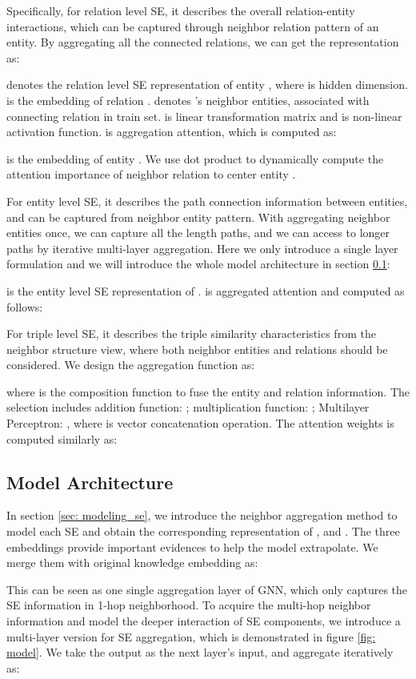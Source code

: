 \documentclass[letterpaper]{article} \usepackage{aaai22}  \usepackage{times}  \usepackage{helvet}  \usepackage{courier}  \usepackage[hyphens]{url}  \usepackage{graphicx} \urlstyle{rm} \def\UrlFont{\rm}  \usepackage{natbib}  \usepackage{caption} \DeclareCaptionStyle{ruled}{labelfont=normalfont,labelsep=colon,strut=off} \frenchspacing  \setlength{\pdfpagewidth}{8.5in}  \setlength{\pdfpageheight}{11in}  \usepackage{algorithm}
\begin{document}
Specifically, for relation level SE, it describes the overall relation-entity interactions, which can be captured through neighbor relation pattern of an entity. By aggregating all the connected relations, we can get the representation as: 

 denotes the relation level SE representation of entity , where  is hidden dimension.  is the embedding of relation .  denotes 's neighbor entities, associated with connecting relation in train set.  is linear transformation matrix and  is non-linear activation function.  is aggregation attention, which is computed as: 

 is the embedding of entity . We use dot product to dynamically compute the attention importance of neighbor relation  to center entity . 

For entity level SE, it describes the path connection information between entities, and can be captured from neighbor entity pattern. With aggregating neighbor entities once, we can capture all the  length paths, and we can access to longer paths by iterative multi-layer aggregation. Here we only introduce a single layer formulation and we will introduce the whole model architecture in section \ref{sec: model arch}: 

 is the entity level SE representation of .  is aggregated attention and computed as follows: 


For triple level SE, it describes the triple similarity characteristics from the neighbor structure view, where both neighbor entities and relations should be considered. We design the aggregation function as: 

where  is the composition function to fuse the entity and relation information. The selection includes addition function: ; multiplication function: ; Multilayer Perceptron: , where  is vector concatenation operation. The attention weights  is computed similarly as: 



\subsection{Model Architecture}
\label{sec: model arch}
In section \ref{sec: modeling_se}, we introduce the neighbor aggregation method to model each SE and obtain the corresponding representation of ,  and . The three embeddings provide important evidences to help the model extrapolate. We merge them with original knowledge embedding as: 

This can be seen as one single aggregation layer of GNN, which only captures the SE information in 1-hop neighborhood. To acquire the multi-hop neighbor information and model the deeper interaction of SE components, we introduce a multi-layer version for SE aggregation, which is demonstrated in figure \ref{fig: model}. We take the output  as the next layer's input, and aggregate iteratively as:
\end{document}
